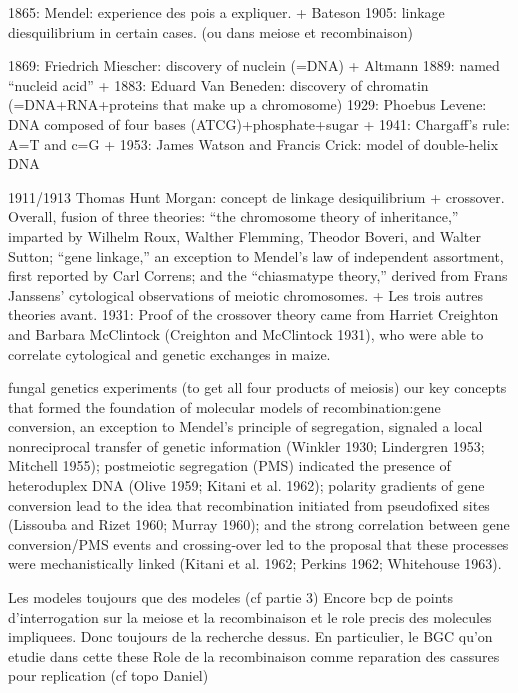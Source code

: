 1865: Mendel: experience des pois a expliquer.
+ Bateson 1905: linkage diesquilibrium in certain cases. (ou dans meiose et recombinaison)

1869: Friedrich Miescher: discovery of nuclein (=DNA) + Altmann 1889: named “nucleid acid”
+ 1883: Eduard Van Beneden: discovery of chromatin (=DNA+RNA+proteins that make up a chromosome)
1929: Phoebus Levene: DNA composed of four bases (ATCG)+phosphate+sugar
+ 1941: Chargaff's rule: A=T and c=G
+ 1953: James Watson and Francis Crick: model of double-helix DNA

1911/1913 Thomas Hunt Morgan: concept de linkage desiquilibrium + crossover. Overall, fusion of three theories: “the chromosome theory of inheritance,” imparted by Wilhelm Roux, Walther Flemming, Theodor Boveri, and Walter Sutton; “gene linkage,” an exception to Mendel’s law of independent assortment, first reported by Carl Correns; and the “chiasmatype theory,” derived from Frans Janssens' cytological observations of meiotic chromosomes.
+ Les trois autres theories avant. 
1931: Proof of the crossover theory came from Harriet Creighton and Barbara McClintock (Creighton and McClintock 1931), who were able to correlate cytological and genetic exchanges in maize.

fungal genetics experiments (to get all four products of meiosis)
our key concepts that formed the foundation of molecular models of recombination:gene conversion, an exception to Mendel’s principle of segregation, signaled a local nonreciprocal transfer of genetic information (Winkler 1930; Lindergren 1953; Mitchell 1955); postmeiotic segregation (PMS) indicated the presence of heteroduplex DNA (Olive 1959; Kitani et al. 1962); polarity gradients of gene conversion lead to the idea that recombination initiated from pseudofixed sites (Lissouba and Rizet 1960; Murray 1960); and the strong correlation between gene conversion/PMS events and crossing-over led to the proposal that these processes were mechanistically linked (Kitani et al. 1962; Perkins 1962; Whitehouse 1963).


Les modeles toujours que des modeles (cf partie 3)
Encore bcp de points d'interrogation sur la meiose et la recombinaison et le role precis des molecules impliquees. Donc toujours de la recherche dessus.
En particulier, le BGC qu'on etudie dans cette these
Role de la recombinaison comme reparation des cassures pour replication  (cf topo Daniel)


